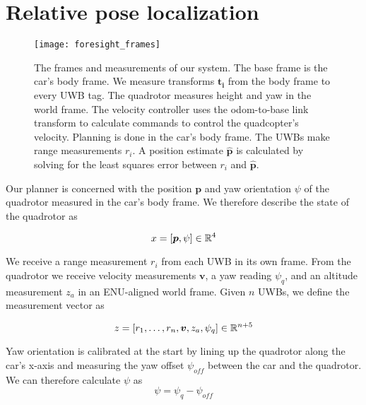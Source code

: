 
\section{Relative pose localization}

\begin{figure}
  \centering
    \texttt{[image: foresight\_frames]}
  \caption{The frames and measurements of our system. The base frame
   is the car's body frame. We measure transforms $\bm{t_{i}}$ from the body
   frame to every UWB tag. The quadrotor measures height and yaw in the world
   frame. The velocity controller uses the odom-to-base\textunderscore 
   link transform to calculate commands to control the quadcopter's velocity.
   Planning is done in the car's body frame.
   The UWBs make range measurements $r_{i}$. A position estimate $\bm{\hat{p}}$
   is calculated by solving for the least squares error between $r_{i}$ and $\bm{\hat{p}}$.}
  \label{fig:frames}
\end{figure}

Our planner is concerned with the position $\bm{p}$ and yaw orientation $\psi$
of the quadrotor measured in the car's body frame. We therefore describe the state of the quadrotor as

$$
    x = [\bm{p}, \psi] \in \mathbb{R}^4
$$

We receive a range measurement $r_i$ from each UWB in its own frame. 
From the quadrotor we receive velocity measurements $\bm{v}$, a yaw reading $\psi_q$,
and an altitude measurement $z_a$ in an ENU-aligned world frame.
Given $n$ UWBs, we define the measurement vector as

$$
   z = [r_1, \dots, r_n, \bm{v}, z_a, \psi_q] \in \mathbb{R}^{n+5}
$$



Yaw orientation is calibrated at the start by lining up the quadrotor along the car's x-axis
and measuring the yaw offset $\psi_{off}$ between the car and the quadrotor.
We can therefore calculate $\psi$ as
$$
   \psi = \psi_q - \psi_{off}
$$

